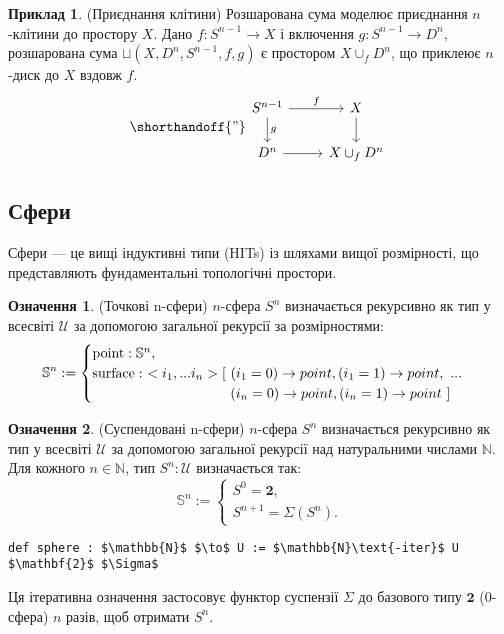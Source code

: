 \documentclass{article}
\theoremstyle{definition}
\newtheorem{definition}{Означення}
\newtheorem{example}{Приклад}
\begin{document}
\begin{example} (Приєднання клітини)
Розшарована сума моделює приєднання \( n \)-клітини до простору \( X \).
Дано \( f : S^{n-1} \to X \) і включення \( g : S^{n-1} \to D^n \),
розшарована сума \( \sqcup(X,D^n,S^{n-1},f,g) \) є
простором \( X \cup_f D^n \), що приклеює \( n \)-диск до \( X \) вздовж \( f \).
\[
\shorthandoff{"}
\begin{tikzcd}
S^{n-1} \arrow[r, "f"] \arrow[d, "g"] & X \arrow[d] \\
D^n \arrow[r] & X \cup_f D^n
\end{tikzcd}
\]
\end{example}

\newpage
\subsection{Сфери}
Сфери — це вищі індуктивні типи (HITs) із шляхами вищої розмірності,
що представляють фундаментальні топологічні простори.

\begin{definition} (Точкові n-сфери)
\( n \)-сфера \( S^n \) визначається рекурсивно як тип у
всесвіті \( \mathcal{U} \) за допомогою загальної рекурсії за розмірностями:
\[
\mathbb{S}^n :=
\begin{cases}
\text{point} : \mathbb{S}^n, \\
\text{surface} :\ <i_1,...i_n> [\ (i_1=0) \rightarrow point, (i_1=1) \rightarrow point,\ ... \\
\hspace{3.47cm} (i_n=0) \rightarrow point, (i_n=1) \rightarrow point\ ]
\end{cases}
\]
\end{definition}

\begin{definition} (Суспендовані n-сфери)
\( n \)-сфера \( S^n \) визначається рекурсивно як тип у
всесвіті \( \mathcal{U} \) за допомогою загальної рекурсії над натуральними
числами \( \mathbb{N} \). Для кожного \( n \in \mathbb{N} \),
тип \( S^n : \mathcal{U} \) визначається так:
\[
\mathbb{S}^n :=
\begin{cases}
S^0 = \mathbf{2}, \\
S^{n+1} = \Sigma(S^n).
\end{cases}
\]
\begin{lstlisting}[mathescape=true]
def sphere : $\mathbb{N}$ $\to$ U := $\mathbb{N}\text{-iter}$ U $\mathbf{2}$ $\Sigma$
\end{lstlisting}
Ця ітеративна означення застосовує функтор суспензії \( \Sigma \)
до базового типу \( \mathbf{2} \) (0-сфера) \( n \) разів, щоб отримати \( S^n \).
\end{definition}
\end{document}
